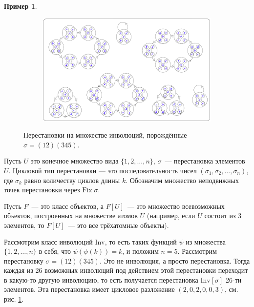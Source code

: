 \documentclass[a5paper]{article}
\theoremstyle{definition}
\newtheorem{example}{Пример}
\begin{document}
\begin{example}
    \begin{figure}[h]
    \centering
    \begin{subfigure}{.8\textwidth}
    	\centering
    	\includegraphics[width=\textwidth]{involutions.png}
    \end{subfigure}%
    \caption{Перестановки на множестве инволюций, порождённые \( \sigma =
(12)(345) \).}
    \label{fig:involutions}	
    \end{figure}
	Пусть \( U \) это конечное множество вида \( \{ 1, 2, \ldots, n \} \), \( 
	\sigma \)~--- перестановка элементов \( U \). Цикловой тип перестановки --- 
	это последовательность чисел \( (\sigma_1, \sigma_2, \ldots, \sigma_n) \), 
	где \( \sigma_k \) равно количеству циклов длины \( k \). Обозначим 
	множество неподвижных точек перестановки через \( \mathrm{Fix}\; \sigma \).
	
	Пусть \( F \)~--- это класс объектов, а \( F[U] \)~--- это множество 
	всевозможных объектов, построенных на множестве атомов \( U \) (например,
    если \( U \) состоит из \( 3 \) элементов, то \( F[U] \)~--- это все трёхатомные
    объекты).
	
	Рассмотрим класс инволюций \( \mathrm{Inv} \), то есть таких функций \( 
	\psi \) из множества \( \{ 1, 2, \ldots, n \} \) в себя, что \( 
	\psi(\psi(k)) = k \), и положим \( n = 5 \). Рассмотрим перестановку \( 
	\sigma = (12)(345) \). Это не инволюция, а просто перестановка.
    Тогда каждая из 26 возможных инволюций под действием 
	этой перестановки переходит в какую-то другую инволюцию, то есть получается 
	перестановка \( \mathrm{Inv}[\sigma] \) 26-ти элементов. Эта перестановка 
	имеет цикловое разложение \( (2,0,2,0,0,3) \), см. рис.
\ref{fig:involutions}.

\end{example}
\end{document}
